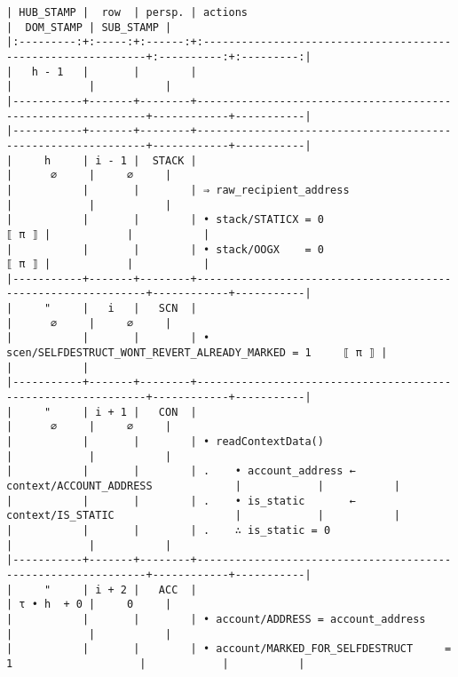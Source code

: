 \documentclass[varwidth=\maxdimen,margin=0.5cm,multi={verbatim}]{standalone}
\begin{document}
\begin{verbatim}
| HUB_STAMP |  row  | persp. | actions                                                      |  DOM_STAMP | SUB_STAMP |
|:---------:+:-----:+:------:+:-------------------------------------------------------------+:----------:+:---------:|
|   h - 1   |       |        |                                                              |            |           |
|-----------+-------+--------+--------------------------------------------------------------+------------+-----------|
|-----------+-------+--------+--------------------------------------------------------------+------------+-----------|
|     h     | i - 1 |  STACK |                                                              |      ∅     |     ∅     |
|           |       |        | ⇒ raw_recipient_address                                      |            |           |
|           |       |        | • stack/STATICX = 0                                    ⟦ π ⟧ |            |           |
|           |       |        | • stack/OOGX    = 0                                    ⟦ π ⟧ |            |           |
|-----------+-------+--------+--------------------------------------------------------------+------------+-----------|
|     "     |   i   |   SCN  |                                                              |      ∅     |     ∅     |
|           |       |        | • scen/SELFDESTRUCT_WONT_REVERT_ALREADY_MARKED = 1     ⟦ π ⟧ |            |           |
|-----------+-------+--------+--------------------------------------------------------------+------------+-----------|
|     "     | i + 1 |   CON  |                                                              |      ∅     |     ∅     |
|           |       |        | • readContextData()                                          |            |           |
|           |       |        | .    • account_address ← context/ACCOUNT_ADDRESS             |            |           |
|           |       |        | .    • is_static       ← context/IS_STATIC                   |            |           |
|           |       |        | .    ∴ is_static = 0                                         |            |           |
|-----------+-------+--------+--------------------------------------------------------------+------------+-----------|
|     "     | i + 2 |   ACC  |                                                              | τ • h  + 0 |     0     |
|           |       |        | • account/ADDRESS = account_address                          |            |           |
|           |       |        | • account/MARKED_FOR_SELFDESTRUCT     = 1                    |            |           |

\end{verbatim}
\end{document}
